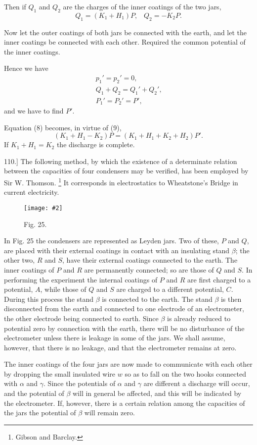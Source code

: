 \documentclass[12pt,oneside]{book}[2021/10/04]
\let\oldfootnote\footnote
\renewcommand\footnote[1]{%
\oldfootnote{\hspace{0.14em}#1}}
\newcommand{\article}[1]{\phantomsection \label{art:#1}{#1.]}}
\newcommand{\widefig}[3]{
\begin{figure}[ht!]
\centering
\texttt{[image: \#2]}
\caption*{\small #3}
\end{figure}}
\newcommand{\¬}{\hphantom{0}}
\begin{document}
Then if \(Q_1\) and \(Q_2\) are the charges of the inner coatings of the
two jars,
\[
Q_1=(K_1+H_1)P\text{,}\quad Q_2=-K_2 P\text{.}\tag{7}
\]

Now let the outer coatings of both jars be connected with the
earth, and let the inner coatings be connected with each other.
Required the common potential of the inner coatings.

Hence we have
\begin{gather*}
{p_1}'={p_2}'=0\text{,}\\
Q_1 + Q_2 = {Q_1}' + {Q_2}'\text{,}\tag{8}\\
{P_1}' = {P_2}' = P'\text{,}\tag{9}
\end{gather*}
and we have to find \(P'\).

Equation (8) becomes, in virtue of (9),
\[
(K_1+H_1-K_2)P=(K_1+H_1+K_2+H_2)P'\text{.}
\]
If \(K_1 + H_1 = K_2\) the discharge is complete.

\article{110} The following method, by which the existence of a determinate
relation between the capacities of four condensers may be
verified, has been employed by Sir W. Thomson.\footnote{Gibson and Barclay.} It corresponds
in electrostatics to Wheatstone's Bridge in current electricity.

\widefig{0.75}{110.png}{Fig. 25.}
In Fig. 25 the condensers are represented as Leyden jars. Two
of these, \(P\) and \(Q\), are placed with their external coatings in contact
with an insulating stand \(\beta\); the other two, \(R\) and \(S\), have their
external coatings connected to the earth. The inner coatings of \(P\)
and \(R\) are permanently connected; so are those of \(Q\) and \(S\). In
performing the experiment the internal coatings of \(P\) and \(R\) are
first charged to a potential, \(A\), while those of \(Q\) and \(S\) are charged
to a different potential, \(C\). During this process the stand \(\beta\) is
connected to the earth. The stand \(\beta\) is then disconnected from the
earth and connected to one electrode of an electrometer, the other
electrode being connected to earth. Since \(\beta\) is already reduced to
potential zero by connection with the earth, there will be no disturbance
of the electrometer unless there is leakage in some of the
jars. We shall assume, however, that there is no leakage, and
that the electrometer remains at zero.

The inner coatings of the four jars are now made to communicate
with each other by dropping the small insulated wire \(w\) so as to
fall on the two hooks connected with \(\alpha\) and \(\gamma\). Since the potentials
of \(\alpha\) and \(\gamma\) are different a discharge will occur, and the potential of
\(\beta\) will in general be affected, and this will be indicated by the
electrometer. If, however, there is a certain relation among the
capacities of the jars the potential of \(\beta\) will remain zero.
\end{document}
